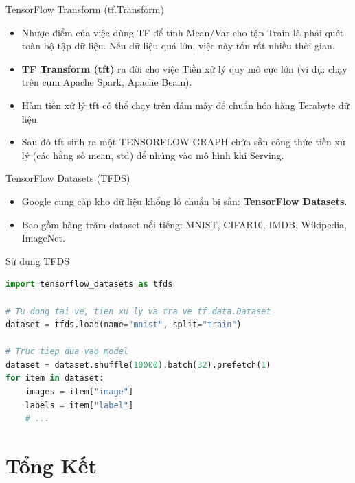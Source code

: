 \documentclass[aspectratio=169]{beamer}
\begin{document}
\begin{frame}{TensorFlow Transform (tf.Transform)}
    \begin{itemize}
        \item Nhược điểm của việc dùng TF để tính Mean/Var cho tập Train là phải quét toàn bộ tập dữ liệu. Nếu dữ liệu quá lớn, việc này tốn rất nhiều thời gian.
        \item \textbf{TF Transform (tft)} ra đời cho việc Tiền xử lý quy mô cực lớn (ví dụ: chạy trên cụm Apache Spark, Apache Beam).
        \item Hàm tiền xử lý tft có thể chạy trên đám mây để chuẩn hóa hàng Terabyte dữ liệu.
        \item Sau đó tft sinh ra một TENSORFLOW GRAPH chứa sẵn công thức tiền xử lý (các hằng số mean, std) để nhúng vào mô hình khi Serving.
    \end{itemize}
\end{frame}

\begin{frame}{TensorFlow Datasets (TFDS)}
    \begin{itemize}
        \item Google cung cấp kho dữ liệu khổng lồ chuẩn bị sẵn: \textbf{TensorFlow Datasets}.
        \item Bao gồm hàng trăm dataset nổi tiếng: MNIST, CIFAR10, IMDB, Wikipedia, ImageNet.
    \end{itemize}
\end{frame}

\begin{frame}[fragile]{Sử dụng TFDS}
\begin{lstlisting}[language=Python]
import tensorflow_datasets as tfds

# Tu dong tai ve, tien xu ly va tra ve tf.data.Dataset
dataset = tfds.load(name="mnist", split="train")

# Truc tiep dua vao model
dataset = dataset.shuffle(10000).batch(32).prefetch(1)
for item in dataset:
    images = item["image"]
    labels = item["label"]
    # ...
\end{lstlisting}
\end{frame}

\section{Tổng Kết}
\end{document}
